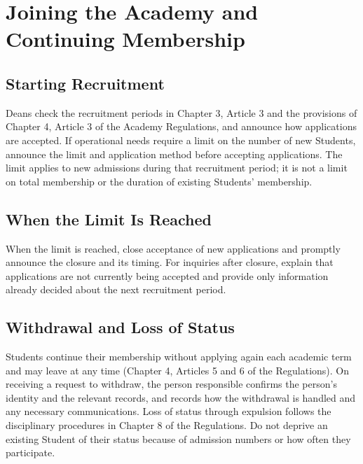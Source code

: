\newpage
\chapter{Joining the Academy and Continuing Membership}

\section{Starting Recruitment}

Deans check the recruitment periods in Chapter 3, Article 3 and the provisions of Chapter 4, Article 3 of the Academy Regulations, and announce how applications are accepted.
If operational needs require a limit on the number of new Students, announce the limit and application method before accepting applications.
The limit applies to new admissions during that recruitment period; it is not a limit on total membership or the duration of existing Students' membership.

\section{When the Limit Is Reached}

When the limit is reached, close acceptance of new applications and promptly announce the closure and its timing.
For inquiries after closure, explain that applications are not currently being accepted and provide only information already decided about the next recruitment period.

\section{Withdrawal and Loss of Status}

Students continue their membership without applying again each academic term and may leave at any time (Chapter 4, Articles 5 and 6 of the Regulations).
On receiving a request to withdraw, the person responsible confirms the person's identity and the relevant records, and records how the withdrawal is handled and any necessary communications.
Loss of status through expulsion follows the disciplinary procedures in Chapter 8 of the Regulations. Do not deprive an existing Student of their status because of admission numbers or how often they participate.
